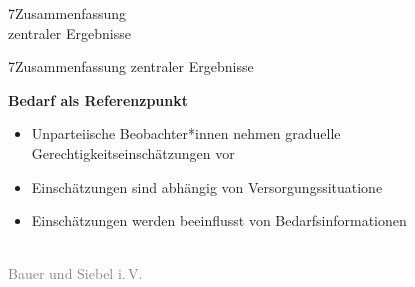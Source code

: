 \documentclass[xcolor=table,9pt,aspectratio=169]{beamer}
\begin{document}
\begin{frame}
\begin{overlayarea}{\textwidth}{0.81\paperheight}{
   \vspace*{11mm}
   \textcolor{uolblue}
   {7\hspace*{1em}Zusammenfassung\\\hspace*{1.5em}zentraler Ergebnisse}
}
\end{overlayarea}
\end{frame}


\begin{frame}{\vspace*{10mm}7\hspace*{1em}Zusammenfassung zentraler Ergebnisse}
\begin{multicols}{2}
   \textbf{Bedarf als Referenzpunkt}
   \medskip
   \begin{itemize}
   \item[(1)] Unparteiische Beobachter*innen nehmen graduelle Gerechtigkeitseinschätzungen vor
   \item[(2)] Einschätzungen sind abhängig von Versorgungssituatione
   \item[(3)] Einschätzungen werden beeinflusst von Bedarfsinformationen
\end{itemize}
   \vfill
   \begin{center}
      \\
      \textcolor{gray}{Bauer und Siebel i.\,V.}
   \end{center}
\end{multicols}
\end{frame}
\end{document}
